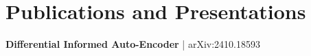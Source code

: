 \documentclass[a4paper,10pt]{article}
\begin{document}
\section*{Publications and Presentations}
\textbf{Differential Informed Auto-Encoder} | arXiv:2410.18593  \\



\printbibliography
\end{document}
